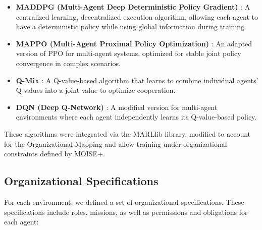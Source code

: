\documentclass[sigconf,anonymous]{aamas}
\begin{document}
\begin{itemize}
    \item \textbf{MADDPG (Multi-Agent Deep Deterministic Policy Gradient)} \cite{lowe2017multi}: A centralized learning, decentralized execution algorithm, allowing each agent to have a deterministic policy while using global information during training.
    
    \item \textbf{MAPPO (Multi-Agent Proximal Policy Optimization)} \cite{yu2021mappo}: An adapted version of PPO for multi-agent systems, optimized for stable joint policy convergence in complex scenarios.
    
    \item \textbf{Q-Mix} \cite{rashid2018qmix}: A Q-value-based algorithm that learns to combine individual agents' Q-values into a joint value to optimize cooperation.
    
    \item \textbf{DQN (Deep Q-Network)} \cite{mnih2015dqn}: A modified version for multi-agent environments where each agent independently learns its Q-value-based policy.
\end{itemize}

These algorithms were integrated via the MARLlib library, modified to account for the Organizational Mapping and allow training under organizational constraints defined by MOISE+.

\subsection{Organizational Specifications}

For each environment, we defined a set of organizational specifications. These specifications include roles, missions, as well as permissions and obligations for each agent:
\end{document}
